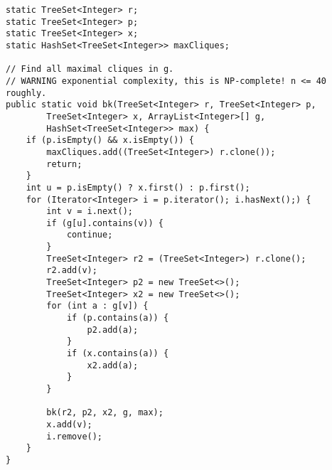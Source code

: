 \begin{verbatim}
static TreeSet<Integer> r;
static TreeSet<Integer> p;
static TreeSet<Integer> x;
static HashSet<TreeSet<Integer>> maxCliques;
	
// Find all maximal cliques in g. 
// WARNING exponential complexity, this is NP-complete! n <= 40 roughly.
public static void bk(TreeSet<Integer> r, TreeSet<Integer> p,
		TreeSet<Integer> x, ArrayList<Integer>[] g,
		HashSet<TreeSet<Integer>> max) {
	if (p.isEmpty() && x.isEmpty()) {
		maxCliques.add((TreeSet<Integer>) r.clone());
		return;
	}
	int u = p.isEmpty() ? x.first() : p.first();
	for (Iterator<Integer> i = p.iterator(); i.hasNext();) {
		int v = i.next();
		if (g[u].contains(v)) {
			continue;
		}
		TreeSet<Integer> r2 = (TreeSet<Integer>) r.clone();
		r2.add(v);
		TreeSet<Integer> p2 = new TreeSet<>();
		TreeSet<Integer> x2 = new TreeSet<>();
		for (int a : g[v]) {
			if (p.contains(a)) {
				p2.add(a);
			}
			if (x.contains(a)) {
				x2.add(a);
			}
		}
		
		bk(r2, p2, x2, g, max);
		x.add(v);
		i.remove();
	}
}
\end{verbatim}